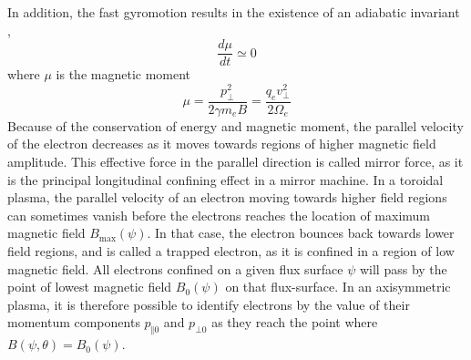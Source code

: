 In addition, the fast gyromotion results in the existence of an adiabatic
invariant \cite{haz91b1}, 
\begin{equation}
\dfrac{d\mu}{dt}\simeq0   \label{mucons0}
\end{equation}
where $\mu$ is the magnetic moment%
\begin{equation}
\mu=\dfrac{p_{\bot}^{2}}{2\gamma m_{e}B}=\dfrac{q_{e}v_{\bot}^{2}}{2\Omega
_{e}}   \label{mu}
\end{equation}
Because of the conservation of energy and magnetic moment, the parallel
velocity of the electron decreases as it moves towards regions of higher
magnetic field amplitude. This effective force in the parallel direction is
called mirror force, as it is the principal longitudinal confining effect in
a mirror machine. In a toroidal plasma, the parallel velocity of an electron
moving towards higher field regions can sometimes vanish before the
electrons reaches the location of maximum magnetic field $B_{\max}\left(
\psi\right) $. In that case, the electron bounces back towards lower field
regions, and is called a trapped electron, as it is confined in a region of
low magnetic field. All electrons confined on a given flux surface $\psi$
will pass by the point of lowest magnetic field $B_{0}\left( \psi\right) $
on that flux-surface. In an axisymmetric plasma, it is therefore possible to
identify electrons by the value of their momentum components $p_{\Vert0}$
and $p_{\bot0}$ as they reach the point where $B\left( \psi,\theta\right)
=B_{0}\left( \psi\right) $.

